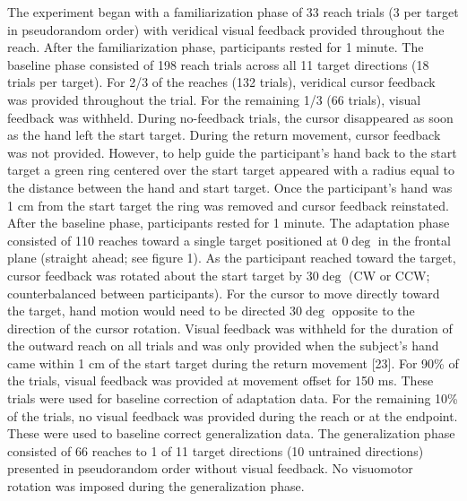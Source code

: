 \documentclass[jou, apacite, 11pt, longtable, floatsintext, notab]{apa6}
\begin{document}
The experiment began with a familiarization phase of 33
reach trials (3 per target in pseudorandom order) with
veridical visual feedback provided throughout the reach.
After the familiarization phase, participants rested for 1
minute. The baseline phase consisted of 198 reach trials
across all 11 target directions (18 trials per target). For
2/3 of the reaches (132 trials), veridical cursor feedback
was provided throughout the trial. For the remaining 1/3 (66
trials), visual feedback was withheld. During no-feedback
trials, the cursor disappeared as soon as the hand left the
start target. During the return movement, cursor feedback
was not provided. However, to help guide the participant’s
hand back to the start target a green ring centered over the
start target appeared with a radius equal to the distance
between the hand and start target. Once the participant’s
hand was 1 cm from the start target the ring was removed and
cursor feedback reinstated. After the baseline phase,
participants rested for 1 minute. The adaptation phase
consisted of 110 reaches toward a single target positioned
at $0\deg$ in the frontal plane (straight ahead; see figure 1).
As the participant reached toward the target, cursor
feedback was rotated about the start target by $30\deg$ (CW or
CCW; counterbalanced between participants). For the cursor
to move directly toward the target, hand motion would need
to be directed $30\deg$ opposite to the direction of the cursor
rotation. Visual feedback was withheld for the duration of
the outward reach on all trials and was only provided when
the subject’s hand came within 1 cm of the start target
during the return movement
[23].
For 90\% of the trials,
visual feedback was provided at movement offset for 150 ms.
These trials were used for baseline correction of adaptation
data. For the remaining 10\% of the trials, no visual
feedback was provided during the reach or at the endpoint.
These were used to baseline correct generalization data. The
generalization phase consisted of 66 reaches to 1 of 11
target directions (10 untrained directions) presented in
pseudorandom order without visual feedback. No visuomotor
rotation was imposed during the generalization phase.
\end{document}
